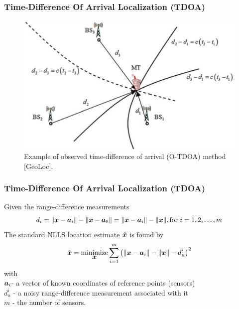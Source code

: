 \documentclass [t] {beamer} %
\begin{document}
\begin{frame} %
\frametitle{Time-Difference Of Arrival Localization (TDOA)}
\begin{figure}[h]
\includegraphics[height=0.7\textheight]{../figures/tdoa_example.png}
\caption{Example of observed time-difference of arrival (O-TDOA) method [GeoLoc].}
\label{fig:2step}
\end{figure}
\end{frame}

\begin{frame} %
\frametitle{Time-Difference Of Arrival Localization (TDOA)}
\phantom{m}
Given the range-difference measurements
\begin{equation}
\nonumber
d_i = \|\mbox{\boldmath$x$} -  \mbox{\boldmath$a$}_i \| - \|\mbox{\boldmath$x$} -  \mbox{\boldmath$a$}_0 \| = \|\mbox{\boldmath$x$} -  \mbox{\boldmath$a$}_i \| - \|\mbox{\boldmath$x$}\|, \mbox{for } i = 1, 2, \ldots, m
\end{equation}
The standard NLLS location estimate $\hat{\mbox{\boldmath$x$}}$ is found by
\begin{equation}
\nonumber
\hat{\mbox{\boldmath$x$}} = \mathop{\mbox{minimize}}_{\mbox{\boldmath$x$}} \sum_{i=1}^m \left(\|\mbox{\boldmath$x$} -  \mbox{\boldmath$a$}_i \| - \|\mbox{\boldmath$x$}\| - d_n^i\right)^2
\end{equation}
with 
\\
$\mbox{\boldmath$a$}_i$- a vector of known coordinates of reference points (sensors)
\\
$d_n^i $ - a noisy range-difference measurement associated with it
\\
$m$ - the number of sensors.
\end{frame}
\end{document}
